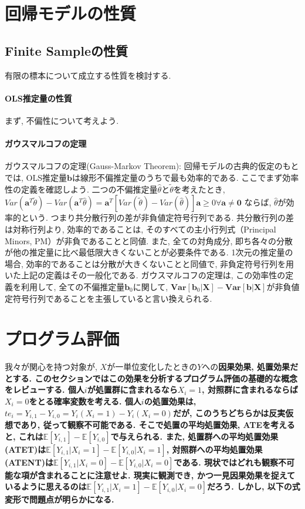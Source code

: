 \documentclass[paper=a4paper,fontsize=10pt]{jlreq}
\begin{document}
\section{回帰モデルの性質}
\subsection{Finite Sampleの性質}
有限の標本について成立する性質を検討する. \\

\paragraph{OLS推定量の性質}
まず, 不偏性について考えよう. \\

\paragraph{ガウスマルコフの定理}
ガウスマルコフの定理(Gauss-Markov Theorem): 回帰モデルの古典的仮定のもとでは, OLS推定量$\mathbf{b}$は線形不偏推定量のうちで最も効率的である. ここでまず効率性の定義を確認しよう. 二つの不偏推定量$\hat{\theta}$と$\tilde{\theta}$を考えたとき, $Var(\mathbf{a}^T\tilde{\theta})-Var(\mathbf{a}^T\hat{\theta})=\mathbf{a}^T[Var(\tilde{\theta})-Var(\hat{\theta})]\mathbf{a} \geq  0　\forall\mathbf{a}\neq \mathbf{0}$ ならば, $\hat{\theta}$が効率的という. つまり共分散行列の差が非負値定符号行列である. 共分散行列の差は対称行列より, 効率的であることは, そのすべての主小行列式（Principal Minors, PM）が非負であることと同値. また, 全ての対角成分, 即ち各々の分散が他の推定量に比べ最低限大きくないことが必要条件である. 1次元の推定量の場合, 効率的であることは分散が大きくないことと同値で, 非負定符号行列を用いた上記の定義はその一般化である. ガウスマルコフの定理は, この効率性の定義を利用して, 全ての不偏推定量$\mathbf{b}_0$に関して, $\mathbf{Var}[\mathbf{b}_0|\mathbf{X}] - \mathbf{Var}[\mathbf{b}|\mathbf{X}]$が非負値定符号行列であることを主張していると言い換えられる.\\

\section{プログラム評価}
我々が関心を持つ対象が, $X$が一単位変化したときの$Y$への\rmfamily\mcfamily\bfseries{因果効果, 処置効果}\mdseries だとする. このセクションではこの効果を分析するプログラム評価の基礎的な概念をレビューする. 個人$i$が処置群に含まれるなら$X_i=1$, 対照群に含まれるならば$X_i=0$をとる確率変数を考える. 個人$i$の処置効果は, $te_i=Y_{i,1}-Y_{i,0}=Y_{i}(X_i=1)-Y_{i}(X_i=0)$だが, このうちどちらかは反実仮想であり, 従って観察不可能である. そこで処置の\rmfamily\mcfamily\bfseries{平均処置効果, ATE}\mdseries を考えると, これは$\mathbb{E}[Y_{i,1}]-\mathbb{E}[Y_{i,0}]$で与えられる. また, 処置群への平均処置効果(ATET)は$\mathbb{E}[Y_{i,1}|X_i=1]-\mathbb{E}[Y_{i,0}|X_i=1]$, 対照群への平均処置効果(ATENT)は$\mathbb{E}[Y_{i,1}|X_i=0]-\mathbb{E}[Y_{i,0}|X_i=0]$である. 現状ではどれも観察不可能な項が含まれることに注意せよ.  現実に観測でき, かつ一見因果効果を捉えているように思えるのは$\mathbb{E}[Y_{i,1}|X_i=1]-\mathbb{E}[Y_{i,0}|X_i=0]$だろう. しかし, 以下の式変形で問題点が明らかになる.
\end{document}
